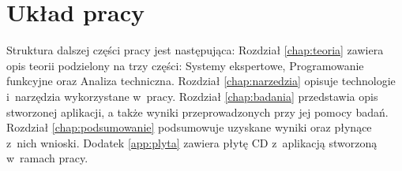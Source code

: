 \section{Układ pracy}

Struktura dalszej części pracy jest następująca: Rozdział \ref{chap:teoria} zawiera opis teorii podzielony na trzy części: Systemy ekspertowe, Programowanie funkcyjne oraz Analiza techniczna. Rozdział \ref{chap:narzedzia} opisuje technologie i~narzędzia wykorzystane w~pracy.  Rozdział \ref{chap:badania} przedstawia opis stworzonej aplikacji, a także wyniki przeprowadzonych przy jej pomocy badań. Rozdział \ref{chap:podsumowanie} podsumowuje uzyskane wyniki oraz płynące z~nich wnioski. Dodatek \ref{app:plyta} zawiera płytę CD z~aplikacją stworzoną w~ramach pracy.
